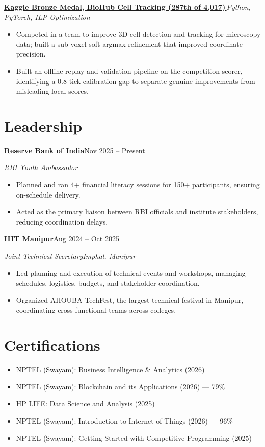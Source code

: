 \documentclass[11pt,letterpaper]{article}
\newcommand{\entry}[2]{%
  \vspace{1pt}\noindent\textbf{#1}\hfill\textit{\small #2}\par\nopagebreak\vspace{1pt}%
}
\newcommand{\org}[2]{%
  \vspace{1pt}\noindent\textbf{#1}\hfill {\small #2}\par\nopagebreak%
}
\newcommand{\role}[2]{%
  \noindent\textit{#1}\hfill\textit{\small #2}\par\nopagebreak\vspace{1pt}%
}
\begin{document}
\entry{\href{https://www.kaggle.com/akkigupta2005}{Kaggle Bronze Medal, BioHub Cell Tracking (287th of 4,017)\,{\small\faKaggle}}}{Python, PyTorch, ILP Optimization}
\begin{itemize}
  \item Competed in a team to improve 3D cell detection and tracking for microscopy data; built a sub-voxel soft-argmax refinement that improved coordinate precision.
  \item Built an offline replay and validation pipeline on the competition scorer, identifying a 0.8-tick calibration gap to separate genuine improvements from misleading local scores.
\end{itemize}

\section*{Leadership}

\org{Reserve Bank of India}{Nov 2025 -- Present}
\role{RBI Youth Ambassador}{}
\begin{itemize}
  \item Planned and ran 4+ financial literacy sessions for 150+ participants, ensuring on-schedule delivery.
  \item Acted as the primary liaison between RBI officials and institute stakeholders, reducing coordination delays.
\end{itemize}

\org{IIIT Manipur}{Aug 2024 -- Oct 2025}
\role{Joint Technical Secretary}{Imphal, Manipur}
\begin{itemize}
  \item Led planning and execution of technical events and workshops, managing schedules, logistics, budgets, and stakeholder coordination.
  \item Organized AHOUBA TechFest, the largest technical festival in Manipur, coordinating cross-functional teams across colleges.
\end{itemize}

\section*{Certifications}
\begin{itemize}
  \item NPTEL (Swayam): Business Intelligence \& Analytics (2026)
  \item NPTEL (Swayam): Blockchain and its Applications (2026) --- 79\%
  \item HP LIFE: Data Science and Analysis (2025)
  \item NPTEL (Swayam): Introduction to Internet of Things (2026) --- 96\%
  \item NPTEL (Swayam): Getting Started with Competitive Programming (2025)
\end{itemize}
\end{document}
